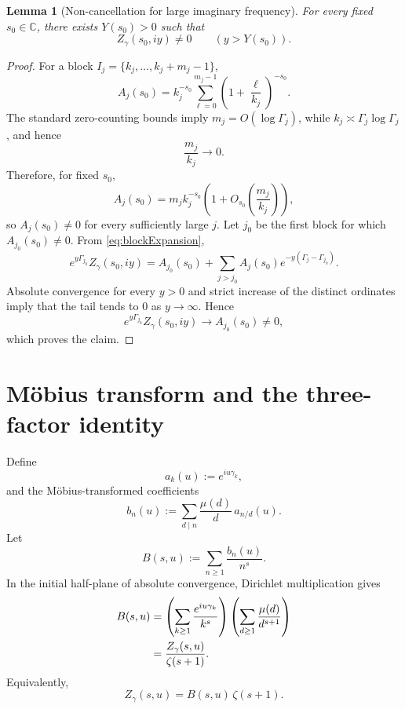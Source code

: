 \documentclass[11pt]{amsart}
\newtheorem{lemma}[theorem]{Lemma}
\theoremstyle{remark}
\begin{document}
\begin{lemma}[Non-cancellation for large imaginary frequency]\label{lem:noncancel}
For every fixed $s_0\in\mathbb C$, there exists $Y(s_0)>0$ such that
\[
Z_\gamma(s_0,iy)\neq0
\qquad (y>Y(s_0)).
\]
\end{lemma}

\begin{proof}
For a block $I_j=\{k_j,\ldots,k_j+m_j-1\}$,
\[
A_j(s_0)
=
k_j^{-s_0}
\sum_{\ell=0}^{m_j-1}
\left(1+\frac{\ell}{k_j}\right)^{-s_0}.
\]
The standard zero-counting bounds imply $m_j=O(\log \Gamma_j)$, while $k_j\asymp \Gamma_j\log\Gamma_j$, and hence
\[
\frac{m_j}{k_j}\longrightarrow0.
\]
Therefore, for fixed $s_0$,
\[
A_j(s_0)
=
m_jk_j^{-s_0}
\left(1+O_{s_0}\!\left(\frac{m_j}{k_j}\right)\right),
\]
so $A_j(s_0)\neq0$ for every sufficiently large $j$.  Let $j_0$ be the first block for which $A_{j_0}(s_0)\neq0$.  From \eqref{eq:blockExpansion},
\[
e^{y\Gamma_{j_0}}Z_\gamma(s_0,iy)
=
A_{j_0}(s_0)
+
\sum_{j>j_0}A_j(s_0)e^{-y(\Gamma_j-\Gamma_{j_0})}.
\]
Absolute convergence for every $y>0$ and strict increase of the distinct ordinates imply that the tail tends to $0$ as $y\to\infty$.  Hence
\[
e^{y\Gamma_{j_0}}Z_\gamma(s_0,iy)
\longrightarrow
A_{j_0}(s_0)\neq0,
\]
which proves the claim.
\end{proof}

\section{M\"obius transform and the three-factor identity}

Define
\[
a_k(u):=e^{iu\gamma_k},
\]
and the M\"obius-transformed coefficients
\begin{equation}\label{eq:bn}
b_n(u)
:=
\sum_{d\mid n}\frac{\mu(d)}{d}\,a_{n/d}(u).
\end{equation}
Let
\begin{equation}\label{eq:Bseries}
B(s,u):=\sum_{n\ge1}\frac{b_n(u)}{n^s}.
\end{equation}
In the initial half-plane of absolute convergence, Dirichlet multiplication gives
\begin{align}
B(s,u)
&=
\left(\sum_{k\ge1}\frac{e^{iu\gamma_k}}{k^s}\right)
\left(\sum_{d\ge1}\frac{\mu(d)}{d^{s+1}}\right)\notag\\
&=
\frac{Z_\gamma(s,u)}{\zeta(s+1)}.
\end{align}
Equivalently,
\begin{equation}\label{eq:threefactor}
\boxed{
Z_\gamma(s,u)=B(s,u)\,\zeta(s+1).
}
\end{equation}
\end{document}
